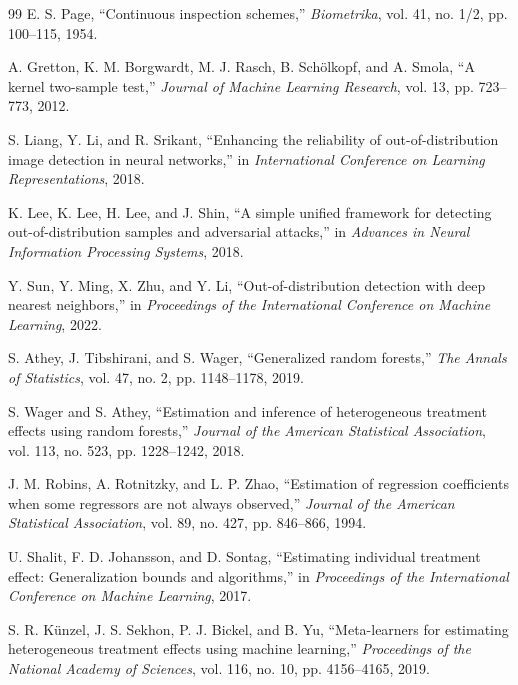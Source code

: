 \documentclass[10pt,conference]{IEEEtran}
\begin{document}
\begin{thebibliography}{99}
E. S. Page, ``Continuous inspection schemes,'' \emph{Biometrika}, vol. 41,
no. 1/2, pp. 100--115, 1954.

A. Gretton, K. M. Borgwardt, M. J. Rasch, B. Sch\"olkopf, and A. Smola,
``A kernel two-sample test,'' \emph{Journal of Machine Learning
Research}, vol. 13, pp. 723--773, 2012.

S. Liang, Y. Li, and R. Srikant, ``Enhancing the reliability of
out-of-distribution image detection in neural networks,'' in
\emph{International Conference on Learning Representations}, 2018.

K. Lee, K. Lee, H. Lee, and J. Shin, ``A simple unified framework for
detecting out-of-distribution samples and adversarial attacks,'' in
\emph{Advances in Neural Information Processing Systems}, 2018.

Y. Sun, Y. Ming, X. Zhu, and Y. Li, ``Out-of-distribution detection with
deep nearest neighbors,'' in \emph{Proceedings of the International
Conference on Machine Learning}, 2022.

S. Athey, J. Tibshirani, and S. Wager, ``Generalized random forests,''
\emph{The Annals of Statistics}, vol. 47, no. 2, pp. 1148--1178, 2019.

S. Wager and S. Athey, ``Estimation and inference of heterogeneous
treatment effects using random forests,'' \emph{Journal of the American
Statistical Association}, vol. 113, no. 523, pp. 1228--1242, 2018.

J. M. Robins, A. Rotnitzky, and L. P. Zhao, ``Estimation of regression
coefficients when some regressors are not always observed,'' \emph{Journal
of the American Statistical Association}, vol. 89, no. 427, pp. 846--866,
1994.

U. Shalit, F. D. Johansson, and D. Sontag, ``Estimating individual
treatment effect: Generalization bounds and algorithms,'' in
\emph{Proceedings of the International Conference on Machine Learning},
2017.

S. R. K\"unzel, J. S. Sekhon, P. J. Bickel, and B. Yu, ``Meta-learners for
estimating heterogeneous treatment effects using machine learning,''
\emph{Proceedings of the National Academy of Sciences}, vol. 116,
no. 10, pp. 4156--4165, 2019.


\end{thebibliography}
\end{document}
